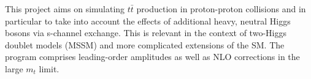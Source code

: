 This project aims on simulating $ t\bar{t} $ production in proton-\/proton collisions and in particular to take into account the effects of additional heavy, neutral Higgs bosons via s-\/channel exchange. This is relevant in the context of two-\/\-Higgs doublet models (M\-S\-S\-M) and more complicated extensions of the S\-M. The program comprises leading-\/order amplitudes as well as N\-L\-O corrections in the large $ m_t $ limit. 